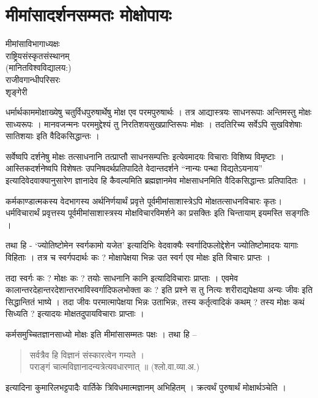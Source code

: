 \chapter{मीमांसादर्शनसम्मतः मोक्षोपायः}

\begin{center}
\smallskip

मीमांसाविभागाध्यक्षः\\
राष्ट्रियसंस्कृतसंस्थानम् \\
(मानितविश्वविद्यालय:)\\
राजीवगान्धीपरिसरः\\
शृङ्गेरी
\addrule
\end{center}
धर्मार्थकाममोक्षाख्येषु चतुर्विधपुरुषार्थेषु मोक्ष एव परमपुरुषार्थः । तत्र आद्यास्त्रयः साधनरूपाः अन्तिमस्तु मोक्षः साध्यरूपः । मानवजन्मनः परममुद्देश्यं तु निरतिशयसुखप्राप्तिरूपः मोक्षः । तदतिरिच्य सर्वेऽपि सुखविशेषाः सातिशयाः इति वैदिकसिद्धान्तः ।

सर्वेष्वपि दर्शनेषु मोक्षः तत्साधनानि तत्प्राप्तौ साधनसम्पत्तिः इत्येवमादयः विचाराः विशिष्य विमृष्टाः । आस्तिकदर्शनेष्वपि विशेषतः उपनिषदर्थप्रतिपादिते वेदान्तदर्शने “नान्यः पन्था विद्यतेऽयनाय” इत्यादिवेदवाक्यानुसारेण ज्ञानादेव हि कैवल्यमिति ब्रह्मज्ञानमेव मोक्षसाधनमिति वैदिकसिद्धान्तः प्रतिपादितः ।

कर्मकाण्डात्मकस्य वेदभागस्य अर्थनिर्णयार्थं प्रवृत्ते पूर्वमीमांसाशास्त्रेऽपि मोक्षतत्साधनविचारः कृतः। धर्मविचारार्थं प्रवृत्तस्य पूर्वमीमांसाशास्त्रस्य मोक्षविचारविमर्शने का प्रसक्तिः इति चिन्तायाम् इयमस्ति सङ्गतिः ।

तथा हि - ‘ज्योतिष्टोमेन स्वर्गकामो यजेत’ इत्यादिभिः वेदवाक्यैः स्वर्गादिफलोद्देशेन ज्योतिष्टोमादयः यागाः विहिताः । तत्र च स्वर्गपदार्थः कः ? मोक्षापेक्षया भिन्नः उत स्वर्ग एव मोक्षः इति विचारः प्राप्तः ।

तदा स्वर्गः कः ? मोक्षः कः ? तयोः साधनानि कानि इत्यादिविचाराः प्राप्ताः । एवमेव कालान्तरदेहान्तरदेशान्तरभाविस्वर्गादिफलभोक्ता कः ? इति प्रश्ने स तु नित्यः शरीराद्यपेक्षया अन्यः जीवः इति सिद्धान्तितं भाष्ये । तदा जीवः परमात्मापेक्षया भिन्नः उताभिन्नः, तस्य कर्तृत्वादिकं कथम् ? तस्य मोक्षः कथं सिध्यति ? इत्यादयः मोक्षतदुपायविचाराः प्राप्ताः ।

कर्मसमुच्चितज्ञानसाध्यो मोक्षः इति मीमांसासम्मतः पक्षः । तथा हि –
\begin{verse}
सर्वत्रैव हि विज्ञानं संस्कारत्वेन गम्यते ।\\
पराङ्गं चात्मविज्ञानादन्यत्रेत्यवधारणात् ॥ (श्लो.वा.व्या.अ.)
\end{verse}
इत्यादिना कुमारिलभट्टपादैः वार्तिके त्रिविधमात्मज्ञानम् अभिहितम् । क्रत्वर्थं पुरुषार्थं मोक्षार्थञ्चेति ।

